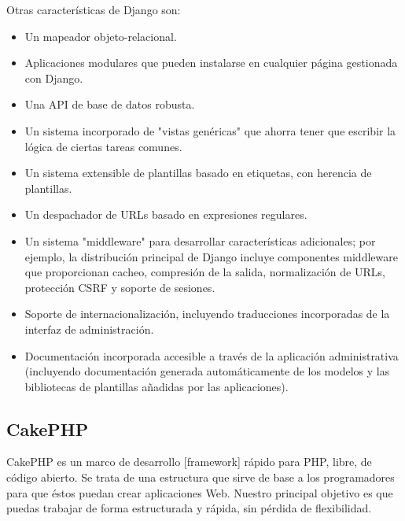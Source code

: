 Otras características de Django son:
\setlength{\parskip}{0mm}
\begin{itemize}

	\item Un mapeador objeto-relacional.
	
	\item Aplicaciones modulares que pueden instalarse en cualquier página gestionada con Django.
	
	\item Una API de base de datos robusta.
	
	\item Un sistema incorporado de "vistas genéricas" que ahorra tener que escribir la lógica de ciertas tareas comunes.
	
	\item Un sistema extensible de plantillas basado en etiquetas, con herencia de plantillas.
	
	\item Un despachador de URLs basado en expresiones regulares.
	
	\item Un sistema "middleware" para desarrollar características adicionales; por ejemplo, la distribución principal de Django incluye componentes middleware que proporcionan cacheo, compresión de la salida, normalización de URLs, protección CSRF y soporte de sesiones.
	
	\item Soporte de internacionalización, incluyendo traducciones incorporadas de la interfaz de administración.
	
	\item Documentación incorporada accesible a través de la aplicación administrativa (incluyendo documentación generada automáticamente de los modelos y las bibliotecas de plantillas añadidas por las aplicaciones).

\end{itemize}




\subsection{CakePHP}
\setlength{\parskip}{5mm}
CakePHP es un marco de desarrollo [framework] rápido para PHP, libre, de código abierto. Se trata de una estructura que sirve de base a los programadores para que éstos puedan crear aplicaciones Web. Nuestro principal objetivo es que puedas trabajar de forma estructurada y rápida, sin pérdida de flexibilidad.

